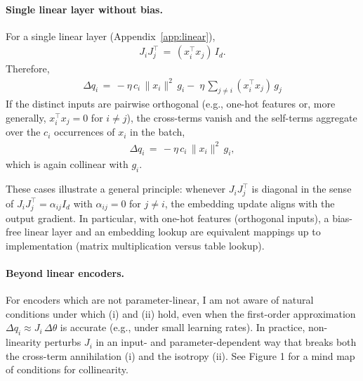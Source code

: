 \paragraph{Single linear layer without bias.}
For a single linear layer (Appendix~\ref{app:linear}),
\begin{align}
J_{i}J_{j}^{\!\top} \,=\, (x_i^{\!\top} x_j)\, I_d. \label{eq:JJ-linear}
\end{align}
Therefore,
\begin{align}
\Delta q_i \,=\, -\eta\,c_i\,\|x_i\|^2\,g_i -\; \eta\,\sum_{j\neq i}(x_i^{\!\top}x_j)\,g_j
\end{align}
If the distinct inputs are pairwise orthogonal (e.g., one-hot features or, more generally, $x_i^{\!\top}x_j=0$ for $i\neq j$), the cross-terms vanish and the self-terms aggregate over the $c_i$ occurrences of $x_i$ in the batch,
\begin{align}
\Delta q_i \,=\, -\eta\,c_i\,\|x_i\|^2\,g_i,
\end{align}
which is again collinear with $g_i$.

These cases illustrate a general principle: whenever $J_{i}J_{j}^{\!\top}$ is diagonal in the sense of \(J_{i}J_{j}^{\!\top} = \alpha_{ij} I_d\) with $\alpha_{ij}=0$ for $j\neq i$, the embedding update aligns with the output gradient. In particular, with one-hot features (orthogonal inputs), a bias-free linear layer and an embedding lookup are equivalent mappings up to implementation (matrix multiplication versus table lookup).

\paragraph{Beyond linear encoders.}\label{sec:beyond-linear}
For encoders which are not parameter-linear, I am not aware of natural conditions under which (i) and (ii) hold, even when the first-order approximation $\Delta q_i \approx J_i\,\Delta\theta$ is accurate (e.g., under small learning rates). In practice, non-linearity perturbs $J_i$ in an input- and parameter-dependent way that breaks both the cross-term annihilation (i) and the isotropy (ii). See Figure 1 for a mind map of conditions for collinearity.
